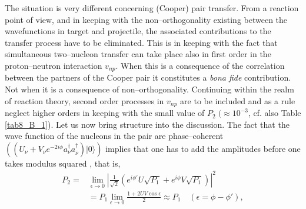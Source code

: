The situation is very different concerning (Cooper) pair transfer. From a reaction point of view, and in keeping with the non--orthogonality existing between the wavefunctions in target and projectile, the associated contributions to the transfer process have to be eliminated. This is in keeping with the fact that simultaneous two--nucleon transfer can take place also in first order in the proton--neutron interaction     $v_{np}$. When this is a consequence of the correlation between the partners of the Cooper pair  it constitutes a \emph{bona fide} contribution. Not when it is a consequence of non--orthogonality. Continuing within the realm of reaction theory, second order processes in $v_{np}$ are to be included  and as a rule neglect higher orders in keeping with the small value of $P_2 \;(\approx10^{-3}$, cf. also Table \ref{tab8_B_1}). Let us now bring structure into the discussion. The fact that the wave function of the nucleons in the pair are phase--coherent $(\left(U_\nu+V_\nu e^{-2i\phi}a_\nu^\dagger a_{\bar\nu}^\dagger\right)|0\rangle)$ implies that one has to add the amplitudes before one takes modulus squared , that is,
\begin{align}\label{eq3.2.19}
\nonumber P_2=&\lim_{\epsilon\rightarrow 0}\left|\frac{1}{\sqrt{2}}\left(e^{i\phi'}U\sqrt{P_1}+e^{i\phi}V\sqrt{P_1}\right)\right|^2\\
&=P_1 \lim_{\epsilon\rightarrow 0} \frac{1+2UV\cos\epsilon}{2}\approx P_1\quad (\epsilon=\phi-\phi'),
\end{align}
